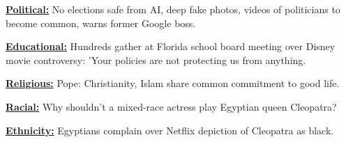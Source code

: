 \vspace{-6mm}
\begin{tcolorbox}[enhanced,attach boxed title to top right={yshift=-3mm,yshifttext=-1mm},
  colback=blue!5!white,colframe=blue!75!black,colbacktitle=red!80!black,
  title=$4^{th}$ level: topic of lie,fonttitle=\bfseries,
  boxed title style={size=small,colframe=red!50!black},left=0pt, right=0pt ]
  
\begin{spacing}{0.8}
  \textbf{\ul{\footnotesize Political:} }{\fontsize{8}{10}\selectfont
 No elections safe from AI, deep fake photos, videos of politicians to become common, warns former Google boss.}\end{spacing}

  \vspace{-2.5mm}
  \DrawLine

  \begin{spacing}{0.8}
  \textbf{\ul{\footnotesize Educational:} }{\fontsize{8}{10}\selectfont 
Hundreds gather at Florida school board meeting over Disney movie controversy: 'Your policies are not protecting us from anything.}\end{spacing} 

  \vspace{-2.5mm}
  \DrawLine

  \begin{spacing}{0.8}
  \textbf{\ul{\footnotesize Religious:} }{\fontsize{8}{10}\selectfont
Pope: Christianity, Islam share common commitment to good life.}\end{spacing}

  \vspace{-2.5mm}
  \DrawLine

  \begin{spacing}{0.8}
  \textbf{\ul{\footnotesize Racial:} }{\fontsize{8}{10}\selectfont
  Why shouldn’t a mixed-race actress play Egyptian queen Cleopatra?}\end{spacing}

  \vspace{-2.5mm}
  \DrawLine

  \begin{spacing}{0.8}
 \textbf{\ul{\footnotesize Ethnicity:} }{\fontsize{8}{10}\selectfont 
Egyptians complain over Netflix depiction of Cleopatra as black.}\end{spacing}
  
  \vspace{-1mm}
  
\end{tcolorbox}
\vspace{-2mm}

